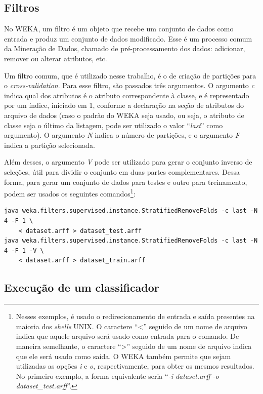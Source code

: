 \subsection{Filtros}
\label{sec:dev_weka_filters}

No WEKA, um filtro é um objeto que recebe um conjunto de dados como entrada e produz um conjunto de dados modificado. Esse é um processo comum da Mineração de Dados, chamado de pré-processamento dos dados: adicionar, remover ou alterar atributos, etc.

Um filtro comum, que é utilizado nesse trabalho, é o de criação de partições para o \emph{cross-validation}. Para esse filtro, são passados três argumentos. O argumento \emph{c} indica qual dos atributos é o atributo correspondente à classe, e é representado por um índice, iniciado em 1, conforme a declaração na seção de atributos do arquivo de dados (caso o padrão do WEKA seja usado, ou seja, o atributo de classe seja o último da listagem, pode ser utilizado o valor ``\emph{last}'' como argumento). O argumento \emph{N} indica o número de partições, e o argumento \emph{F} indica a partição selecionada.

Além desses, o argumento \emph{V} pode ser utilizado para gerar o conjunto inverso de seleções, útil para dividir o conjunto em duas partes complementares. Dessa forma, para gerar um conjunto de dados para testes e outro para treinamento, podem ser usados os seguintes comandos\footnote{Nesses exemplos, é usado o redirecionamento de entrada e saída presentes na maioria dos \emph{shells} UNIX. O caractere ``<'' seguido de um nome de arquivo indica que aquele arquivo será usado como entrada para o comando. De maneira semelhante, o caractere ``>'' seguido de um nome de arquivo indica que ele será usado como saída. O WEKA também permite que sejam utilizadas as opções \emph{i} e \emph{o}, respectivamente, para obter os mesmos resultados. No primeiro exemplo, a forma equivalente seria ``\emph{-i dataset.arff -o dataset\_test.arff}''.}:

\begin{lstlisting}[caption=Filtro para geração de partições para \emph{cross-validation}, label=lst:dev_filter]
java weka.filters.supervised.instance.StratifiedRemoveFolds -c last -N 4 -F 1 \
    < dataset.arff > dataset_test.arff
java weka.filters.supervised.instance.StratifiedRemoveFolds -c last -N 4 -F 1 -V \
    < dataset.arff > dataset_train.arff
\end{lstlisting}

\subsection{Execução de um classificador}

